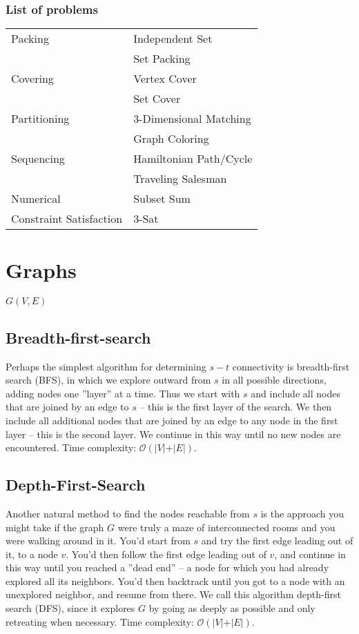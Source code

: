 \documentclass[a4paper,landscape]{article}
\theoremstyle{definition}
\begin{document}
\begin{multicols*}{3}
\subsubsection{List of problems}
\begin{tabular}{l l}
Packing                 & Independent Set \\
                        & Set Packing \\
Covering                & Vertex Cover \\
                        & Set Cover \\
Partitioning            & 3-Dimensional Matching \\
                        & Graph Coloring \\
Sequencing              & Hamiltonian Path/Cycle \\
                        & Traveling Salesman \\
Numerical               & Subset Sum \\
Constraint Satisfaction & 3-Sat \\
\end{tabular}


\section{Graphs}
$G(V, E)$

\subsection{Breadth-first-search}
Perhaps the simplest algorithm for determining $s-t$ connectivity is
breadth-first search (BFS), in which we explore outward from $s$ in all
possible directions, adding nodes one ''layer'' at a time. Thus we start with
$s$ and include all nodes that are joined by an edge to $s$ -- this is the first
layer of the search. We then include all additional nodes that are joined
by an edge to any node in the first layer -- this is the second layer. We
continue in this way until no new nodes are encountered. 
Time complexity: $\mathcal{O}(\vert{V}\vert + \vert{E}\vert)$.

\subsection{Depth-First-Search}
Another natural method to find the nodes reachable from $s$ is the approach
you might take if the graph $G$ were truly a maze of interconnected rooms
and you were walking around in it. You'd start from $s$ and try the first
edge leading out of it, to a node $v$. You'd then follow the first edge
leading out of $v$, and continue in this way until you reached a ''dead
end'' -- a node for which you had already explored all its neighbors. You'd
then backtrack until you got to a node with an unexplored neighbor, and
resume from there. We call this algorithm depth-first search (DFS), since
it explores $G$ by going as deeply as possible and only retreating when
necessary. Time complexity: $\mathcal{O}(\vert{V}\vert + \vert{E}\vert)$.


\end{multicols*}
\end{document}
